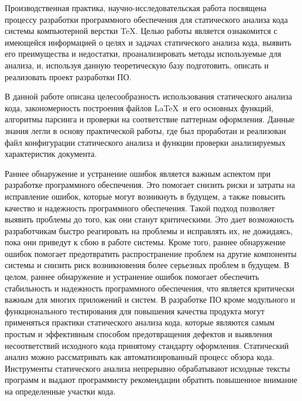 \intro
Производственная практика, научно-исследовательская работа посвящена процессу разработки программного обеспечения для статического анализа кода системы компьютерной верстки \TeX. Целью работы является ознакомится с имеющейся информацией о целях и задачах статического анализа кода, выявить его преимущества и недостатки, проанализировать методы используемые для анализа, и, используя данную теоретическую базу подготовить, описать и реализовать проект разработки ПО.

 В данной работе описана целесообразность использования статического анализа кода, закономерность построения файлов \LaTeX \ и его основных функций, алгоритмы парсинга и проверки на соответствие паттернам оформления.  Данные знания легли в основу практической работы, где был проработан и реализован файл конфигурации статического анализа и функции проверки анализируемых характеристик документа.

Раннее обнаружение и устранение ошибок является важным аспектом при разработке программного обеспечения. Это помогает снизить риски и затраты на исправление ошибок, которые могут возникнуть в будущем, а также повысить качество и надежность программного обеспечения.
Такой подход позволяет выявить проблемы до того, как они станут критическими. Это дает возможность разработчикам быстро реагировать на проблемы и исправлять их, не дожидаясь, пока они приведут к сбою в работе системы. Кроме того, раннее обнаружение ошибок помогает предотвратить распространение проблем на другие компоненты системы и снизить риск возникновения более серьезных проблем в будущем.
В целом, раннее обнаружение и устранение ошибок помогает обеспечить стабильность и надежность программного обеспечения, что является критически важным для многих приложений и систем. В разработке ПО кроме модульного и функционального тестирования для повышения качества продукта могут применяться практики статического анализа кода, которые являются самым простым и эффективным способом предотвращения дефектов и выявления несоответствий исходного кода принятому стандарту оформления. Статический анализ можно рассматривать как автоматизированный процесс обзора кода. Инструменты статического анализа непрерывно обрабатывают исходные тексты программ и выдают программисту рекомендации обратить повышенное внимание на определенные участки кода.
